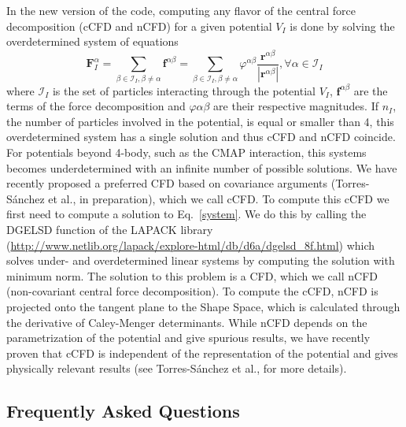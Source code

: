 \documentclass[10pt,letterpaper,notitlepage]{article}
\begin{document}
In the new version of the code, computing any flavor of the central force decomposition (cCFD and nCFD) for a given potential $V_I$ is done by solving the overdetermined system of equations
\begin{equation}
\label{system}
\bm{F}_I^\alpha = \sum_{\beta\in\mathcal{I}_I,\beta\neq\alpha}  \bm{f}^{\alpha\beta}= \sum_{\beta\in\mathcal{I}_I,\beta\neq\alpha}  \varphi^{\alpha\beta}\frac{\bm{r}^{\alpha\beta}}{|\bm{r}^{\alpha\beta}|}, \forall \alpha \in \mathcal{I}_I
\end{equation}
where $\mathcal{I}_I$ is the set of particles interacting through the potential $V_I$, $\bm{f}^{\alpha\beta}$ are the terms of the force decomposition and $\varphi{\alpha\beta}$ are their respective magnitudes. If $n_I$, the number of particles involved in the potential, is equal or smaller than 4, this overdetermined system has a single solution and thus cCFD and nCFD coincide. For potentials beyond 4-body, such as the CMAP interaction, this systems becomes underdetermined with an infinite number of possible solutions. We have recently proposed a preferred CFD based on covariance arguments (Torres-S\'anchez et al., in preparation), which we call cCFD. To compute this cCFD we first need to compute a solution to Eq.~\eqref{system}. We do this by calling the DGELSD function of the LAPACK library (\url{http://www.netlib.org/lapack/explore-html/db/d6a/dgelsd_8f.html}) which solves under- and overdetermined linear systems by computing the solution with minimum norm. The solution to this problem is a CFD, which we call nCFD (non-covariant central force decomposition). To compute the cCFD, nCFD is projected onto the tangent plane to the Shape Space, which is calculated through the derivative of Caley-Menger determinants. While nCFD depends on the parametrization of the potential and give spurious results, we have recently proven that cCFD is independent of the representation of the potential and gives physically relevant results (see Torres-S\'anchez et al., for more details). 

\subsection{Frequently Asked Questions}
\end{document}
